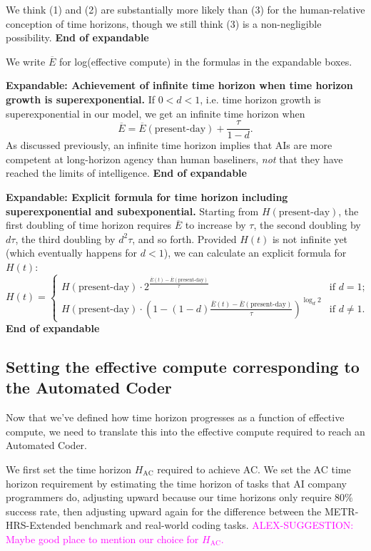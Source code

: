 \documentclass{article}
\theoremstyle{definition}
\newcommand{\ASUG}[1]{\textcolor{magenta}{ALEX-SUGGESTION: #1}}
\begin{document}
We think (1) and (2) are substantially more likely than (3) for the human-relative conception of time horizons, though we still think (3) is a non-negligible possibility. \textbf{End of expandable}

We write $\overline{E}$ for log(effective compute) in the formulas in the expandable boxes.

\textbf{Expandable: Achievement of infinite time horizon when time horizon growth is superexponential.} If $0 < d < 1$, i.e. time horizon growth is superexponential in our model, we get an infinite time horizon when
\[ \overline{E} = \overline{E}(\text{present-day}) + \frac{\tau}{1-d}.\]
As discussed previously, an infinite time horizon implies that AIs are more competent at long-horizon agency than human baseliners, \textit{not} that they have reached the limits of intelligence. \textbf{End of expandable}

\textbf{Expandable: Explicit formula for time horizon including superexponential and subexponential.}
Starting from $H(\text{present-day})$, the first doubling of time horizon requires $\overline{E}$ to increase by $\tau$, the second doubling by $d \tau$, the third doubling by $d^2 \tau$, and so forth. Provided $H(t)$ is not infinite yet (which eventually happens for $d < 1$), we can calculate an explicit formula for $H(t)$:
\[ H(t) = 
\begin{cases} 
H(\text{present-day}) \cdot 2^{\frac{\overline{E}(t)-\overline{E}(\text{present-day})}{\tau}} & \text{if $d = 1$}; \\
H(\text{present-day}) \cdot \left(1 - (1-d) \frac{\overline{E}(t)-\overline{E}(\text{present-day})}{\tau}\right)^{\log_d 2} & \text{if $d \neq 1$.}
\end{cases}
\]
\textbf{End of expandable}


\subsection{Setting the effective compute corresponding to the Automated Coder} \label{Automated Coder effective compute}

Now that we've defined how time horizon progresses as a function of effective compute, we need to translate this into the effective compute required to reach an Automated Coder.

We first set the time horizon $H_{\text{AC}}$ required to achieve AC. We set the AC time horizon requirement by estimating the time horizon of tasks that AI company programmers do, adjusting upward because our time horizons only require $80\%$ success rate, then adjusting upward again for the difference between the METR-HRS-Extended benchmark and real-world coding tasks. \ASUG{Maybe good place to mention our choice for $H_{\text{AC}}$.}
\end{document}
